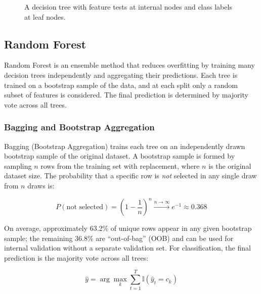 \documentclass[10pt,a4paper]{article}
\begin{document}
\begin{figure}[H]
    \centering
    \caption{A decision tree with feature tests at internal nodes and class labels at leaf nodes.}
    \label{fig:decision-tree-example}
\end{figure}

\subsection{Random Forest}
\label{sec:random-forest}

Random Forest is an ensemble method that reduces overfitting by training many decision trees independently and aggregating their predictions. Each tree is trained on a bootstrap sample of the data, and at each split only a random subset of features is considered. The final prediction is determined by majority vote across all trees.

\subsubsection{Bagging and Bootstrap Aggregation}

Bagging (Bootstrap Aggregation) trains each tree on an independently drawn bootstrap sample of the original dataset. A bootstrap sample is formed by sampling $n$ rows from the training set with replacement, where $n$ is the original dataset size. The probability that a specific row is \emph{not} selected in any single draw from $n$ draws is:

\begin{equation}
P(\text{not selected}) = \left(1 - \frac{1}{n}\right)^n \xrightarrow{n \to \infty} e^{-1} \approx 0.368
\label{eq:oob-prob}
\end{equation}

On average, approximately 63.2\% of unique rows appear in any given bootstrap sample; the remaining 36.8\% are ``out-of-bag'' (OOB) and can be used for internal validation without a separate validation set. For classification, the final prediction is the majority vote across all trees:

\begin{equation}
\hat{y} = \arg\max_{k} \sum_{t=1}^{T} \mathbb{I}(\hat{y}_t = c_k)
\label{eq:rf-vote}
\end{equation}
\end{document}
